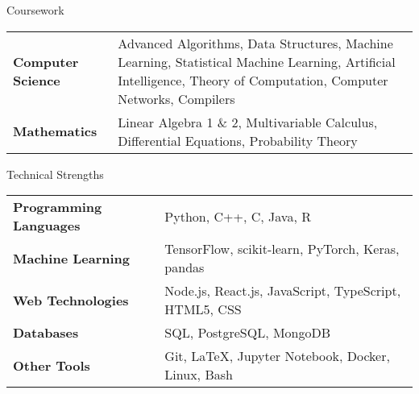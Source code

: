 \documentclass[
    11pt, %
]{resume} %
\begin{document}
\begin{rSection}{Coursework}
\vspace*{-0.3cm}
  \begin{tabular}{ @{} >{\bfseries}l p{14cm} }
    Computer Science & Advanced Algorithms, Data Structures, Machine Learning, Statistical Machine Learning, Artificial Intelligence, Theory of Computation, Computer Networks, Compilers  \\
    Mathematics & Linear Algebra 1 \& 2, Multivariable Calculus, Differential Equations, Probability Theory \\
  \end{tabular}
\end{rSection}
\vspace*{-0.2cm}

\vspace*{-0.3cm}
\begin{rSection}{Technical Strengths}
\vspace*{-0.3cm}


\begin{tabular}{ @{} >{\bfseries}l @{\hspace{6ex}} l }
    Programming Languages & Python, C++, C, Java, R \\
    Machine Learning & TensorFlow, scikit-learn, PyTorch, Keras, pandas \\
    Web Technologies & Node.js, React.js, JavaScript, TypeScript, HTML5, CSS  \\
    Databases & SQL, PostgreSQL, MongoDB \\
    Other Tools & Git, LaTeX, Jupyter Notebook, Docker, Linux, Bash \\
\end{tabular} 


\end{rSection}
\end{document}

